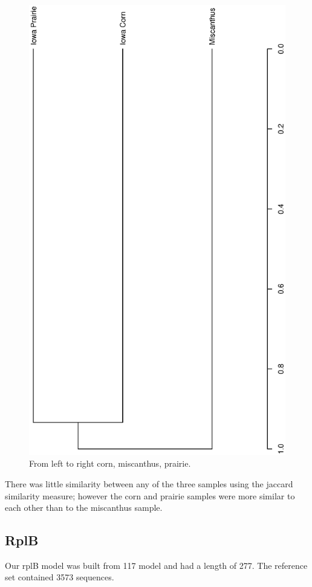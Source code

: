 \documentclass{article}
\begin{document}
\begin{figure}
\centering\includegraphics[width=120mm]{jaccard/paper_jaccard.eps}
\caption{From left to right corn, miscanthus, prairie.}
\end{figure}

There was little similarity between any of the three samples using the jaccard similarity measure; however the corn and prairie samples were more similar to each other than to the miscanthus sample.

\subsection{RplB}
Our rplB model was built from 117 model and had a length of 277.  The reference set contained 3573 sequences.
\end{document}

